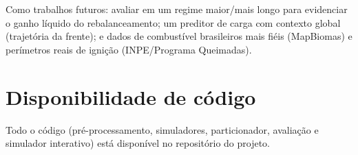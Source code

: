 \documentclass[12pt]{article}
\begin{document}
Como trabalhos futuros: avaliar em um regime maior/mais longo para evidenciar o
ganho líquido do rebalanceamento; um preditor de carga com contexto global
(trajetória da frente); e dados de combustível brasileiros mais fiéis (MapBiomas) e
perímetros reais de ignição (INPE/Programa Queimadas).

\section*{Disponibilidade de código}

Todo o código (pré-processamento, simuladores, particionador, avaliação e
simulador interativo) está disponível no repositório do projeto.



\end{document}
